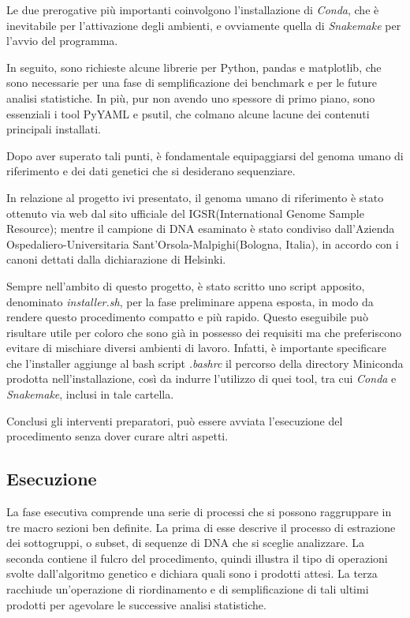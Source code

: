 Le due prerogative più importanti coinvolgono l'installazione di \textit{Conda}, che è inevitabile per l'attivazione degli ambienti, e ovviamente quella di \textit{Snakemake} per l'avvio del programma.


In seguito, sono richieste alcune librerie per Python, pandas e matplotlib, che sono necessarie per una fase di semplificazione dei benchmark e per le future analisi statistiche.
In più, pur non avendo uno spessore di primo piano, sono essenziali i tool PyYAML e psutil, che colmano alcune lacune dei contenuti principali installati.


Dopo aver superato tali punti, è fondamentale equipaggiarsi del genoma umano di riferimento e dei dati genetici che si desiderano sequenziare.


In relazione al progetto ivi presentato, il genoma umano di riferimento è stato ottenuto via web dal sito ufficiale del IGSR(International Genome Sample Resource); mentre il campione di DNA esaminato è stato condiviso dall'Azienda Ospedaliero-Universitaria Sant'Orsola-Malpighi(Bologna, Italia), in accordo con i canoni dettati dalla dichiarazione di Helsinki.

Sempre nell'ambito di questo progetto, è stato scritto uno script apposito, denominato \textit{installer.sh}, per la fase preliminare appena esposta, in modo da rendere questo procedimento compatto e più rapido.
Questo eseguibile può risultare utile per coloro che sono già in possesso dei requisiti ma che preferiscono evitare di mischiare diversi ambienti di lavoro.
Infatti, è importante specificare che l'installer aggiunge al bash script \textit{.bashrc} il percorso della directory Miniconda prodotta nell'installazione, così da indurre l'utilizzo di quei tool, tra cui \textit{Conda} e \textit{Snakemake}, inclusi in tale cartella.

Conclusi gli interventi preparatori, può essere avviata l'esecuzione del procedimento senza dover curare altri aspetti.


\subsection{Esecuzione}
La fase esecutiva comprende una serie di processi che si possono raggruppare in tre macro sezioni ben definite.
La prima di esse descrive il processo di estrazione dei sottogruppi, o subset, di sequenze di DNA che si sceglie analizzare.
La seconda contiene il fulcro del procedimento, quindi illustra il tipo di operazioni svolte dall'algoritmo genetico e dichiara quali sono i prodotti attesi.
La terza racchiude un'operazione di riordinamento e di semplificazione di tali ultimi prodotti per agevolare le successive analisi statistiche.


